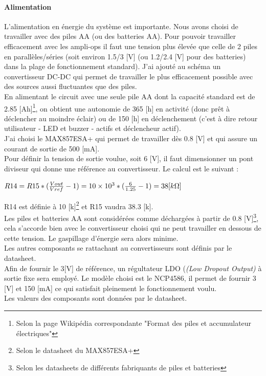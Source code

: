 \documentclass[a4paper,10pt]{article}
\begin{document}
 \paragraph{Alimentation}
 L'alimentation en énergie du système est importante. Nous avons choisi de travailler avec des piles AA (ou des batteries AA). Pour pouvoir travailler efficacement avec les ampli-ops il faut une tension plus élevée que celle de 2 piles en parallèles/séries (soit environ 1.5/3 [V] (ou 1.2/2.4 [V] pour des batteries) dans la plage de fonctionnement standard). J'ai ajouté au schéma un convertisseur DC-DC qui permet de travailler le plus efficacement possible avec des sources aussi fluctuantes que des piles. \\
 En alimentant le circuit avec une seule pile AA dont la capacité standard est de 2.85 [Ah]\footnote{Selon la page Wikipédia correspondante "Format des piles et accumulateur électriques"}, on obtient une autonomie de 365 [h] en activité (donc prêt à déclencher au moindre éclair) ou de 150 [h] en déclenchement (c'est à dire retour utilisateur - LED et buzzer - actifs et déclencheur actif).\\
 J'ai choisi le MAX857ESA+ qui permet de travailler dès 0.8 [V] et qui assure un courant de sortie de 500 [mA]. \\
 Pour définir la tension de sortie voulue, soit 6 [V], il faut dimensionner un pont diviseur qui donne une référence au convertisseur. Le calcul est le suivant :
\begin{center}
 $ R14 = R15*(\frac{Vout}{Vref}-1) = \num{10e3}*(\frac{6}{1.25}-1) = 38 [k\ohm]$
\end{center} 
R14 est définie à 10 [k\ohm]\footnote{Selon le datasheet du MAX857ESA+} et R15 vaudra 38.3 [k\ohm].\\
Les piles et batteries AA sont considérées comme déchargées à partir de 0.8 [V]\footnote{Selon les datasheets de différents fabriquants de piles et batteries}, cela s'accorde bien avec le convertisseur choisi qui ne peut travailler en dessous de cette tension. Le gaspillage d'énergie sera alors minime.\\
Les autres composants se rattachant au convertisseurs sont définis par le datasheet.\\
Afin de fournir le 3[V] de référence, un régultateur LDO ({\itshape(Low Dropout Output)} à sortie fixe sera employé. Le modèle choisi est le NCP4586, il permet de fournir 3 [V] et 150 [mA] ce qui satisfait pleinement le fonctionnement voulu.\\
Les valeurs des composants sont données par le datasheet.
\end{document}
